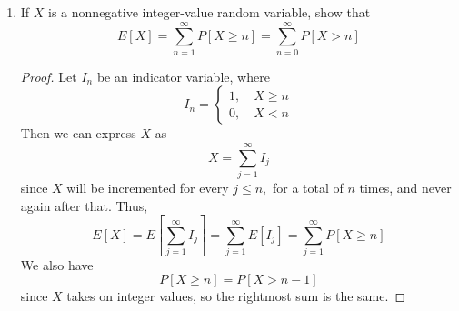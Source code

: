 \documentclass{article}
\begin{document}
\begin{enumerate}
		\newpage
	\item If $X$ is a nonnegative integer-value random variable, show that
		\[E[X] = \sum_{n=1}^{\infty} P[X\ge n] = \sum_{n=0}^{\infty}P[X>n]\]
		\begin{proof}
			Let $I_n$ be an indicator variable, where
			\[I_n=\begin{cases}
					1, \quad X\ge n \\
					0, \quad X < n
			\end{cases}\]
			Then we can express $X$ as
			\[X=\sum_{j=1}^{\infty} I_j\]
			since $X$ will be incremented for every $j\le n,$ for a total of $n$ times, and never again after that. Thus,
			\[E[X] = E\left[ \sum_{j=1}^{\infty}I_j \right] = \sum_{j=1}^{\infty}E[I_j] = \sum_{j=1}^{\infty}P[X\ge n]\]
			We also have
			\[P[X\ge n] = P[X>n-1]\]
			since $X$ takes on integer values, so the rightmost sum is the same.
		\end{proof}
		
\end{enumerate}
\end{document}
